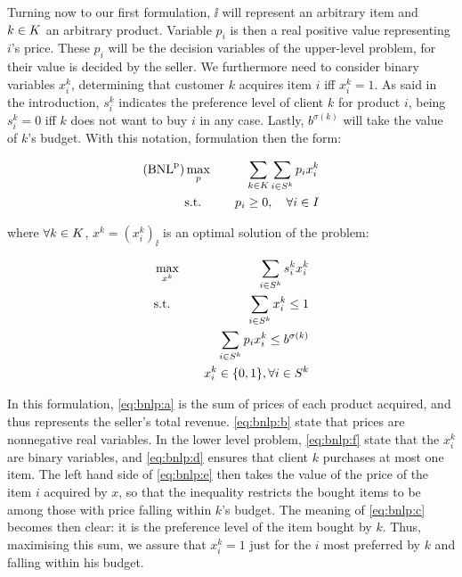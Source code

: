 Turning now to our first formulation, $\ii$ will represent an arbitrary item and
${k \in K}$ an arbitrary product. Variable $p_i$ is then a real positive value
representing $i$'s price. These $p_i$ will be the decision variables of the
upper-level problem, for their value is decided by the seller. We furthermore
need to consider binary variables $x_i^k$, determining that customer $k$
acquires item $i$ iff $x_i^k = 1$. As said in the introduction, $s_i^k$
indicates the preference level of client $k$ for product $i$, being $s_i^k = 0$
iff $k$ does not want to buy $i$ in any case. Lastly, $b^{\sigma(k)}$ will take
the value of $k$'s budget. With this notation, formulation \bnlp then the form:

{
    \newcommand{\sums} {
        \sum_\kk \sum_\is
    }

    \begin{eqnarray}
        \rm{(BNL}^p\rm{)}
        &\max_p      & \quad \sums p_i x_i^k              \label{eq:bnlp:a}\\
        &\text{s.t.} & \quad p_i \geq 0, \quad \forall\ii \label{eq:bnlp:b}
    \end{eqnarray}
}

\noindent
where $\forall {\ensuremath{k \in K}}$, $x^k = (x_i^k)_\ii$ is an optimal solution of the
problem:

{
    \newcommand{\sums} {
        \sum_\is
    }

    \begin{eqnarray}
        &\max_{x^k}  & \quad \sums s_i^k x_i^k                  \label{eq:bnlp:c}\\
        &\text{s.t.} & \quad \sums x_i^k     \leq 1             \label{eq:bnlp:d}\\
        &            & \quad \sums p_i x_i^k \leq b^{\sigma(k)} \label{eq:bnlp:e}\\
        &            & \quad x_i^k \in \binset, \forall \is     \label{eq:bnlp:f}
    \end{eqnarray}
}

In this formulation, \eqref{eq:bnlp:a} is the sum of prices of each product
acquired, and thus represents the seller's total revenue. \eqref{eq:bnlp:b}
state that prices are nonnegative real variables. In the lower level problem,
\eqref{eq:bnlp:f} state that the $x_i^k$ are binary variables, and
\eqref{eq:bnlp:d} ensures that client $k$ purchases at most one item. The left
hand side of \eqref{eq:bnlp:e} then takes the value of the price of the item $i$
acquired by $x$, so that the inequality restricts the bought items to be among
those with price falling within $k$'s budget.  The meaning of \eqref{eq:bnlp:c}
becomes then clear: it is the preference level of the item bought by $k$. Thus,
maximising this sum, we assure that $x_i^k = 1$ just for the $i$ most preferred
by $k$ and falling within his budget.

